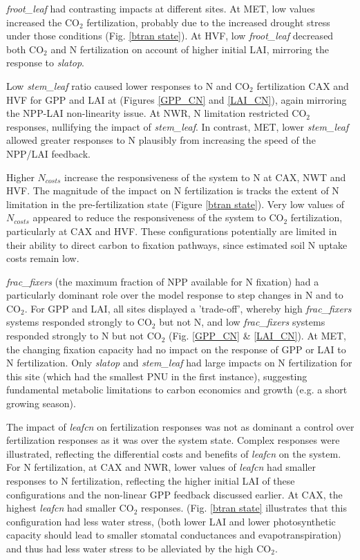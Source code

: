 \documentclass[draft,linenumbers]{agujournal}
\begin{document}
\emph{froot\_leaf} had contrasting impacts at different sites.  At MET,  low values increased the CO$_{2}$ fertilization, probably due to the increased drought stress under those conditions (Fig. \ref{btran state}). At HVF, low \emph{froot\_leaf} decreased both CO$_{2}$ and N fertilization on account of higher initial LAI, mirroring the response to \emph{slatop}. 

Low \emph{stem\_leaf} ratio caused lower responses to N and CO$_{2}$ fertilization CAX and HVF for GPP and LAI at  (Figures \ref{GPP_CN} and \ref{LAI_CN}), again mirroring the NPP-LAI non-linearity issue.  At NWR,  N limitation restricted CO$_{2}$ responses, nullifying the impact of \emph{stem\_leaf}.  In contrast, MET, lower \emph{stem\_leaf} allowed greater responses to N plausibly from increasing the speed of the NPP/LAI feedback.  

Higher $N_{costs}$ increase the responsiveness of the system to N at CAX, NWT and HVF.  The magnitude of the impact on N fertilization is tracks the extent of N limitation in the pre-fertilization state (Figure \ref{btran state}).   Very low values of $N_{costs}$ appeared to reduce the responsiveness of the system to CO$_{2}$ fertilization, particularly at CAX and HVF. These configurations potentially are limited in their ability to direct carbon to fixation pathways, since estimated soil N uptake costs remain low.   

\emph{frac\_fixers} (the maximum fraction of NPP available for N fixation) had a particularly dominant role over the model response to step changes in N and to CO$_{2}$. For GPP and LAI, all sites displayed a 'trade-off', whereby high \emph{frac\_fixers} systems responded strongly to CO$_{2}$ but not N, and low \emph{frac\_fixers} systems responded strongly to N but not CO$_{2}$ (Fig. \ref{GPP_CN} \& \ref{LAI_CN}).   At MET,  the changing fixation capacity had no impact on the response of GPP or LAI to N fertilization.  Only \emph{slatop} and \emph{stem\_leaf} had large impacts on N fertilization for this site (which had the smallest PNU in the first instance), suggesting fundamental metabolic limitations to carbon economics and growth (e.g. a short growing season). 

The impact of \emph{leafcn} on fertilization responses was not as dominant a control over fertilization responses as it was over the system state. Complex responses were illustrated, reflecting the differential costs and benefits of \emph{leafcn} on the system.  For N fertilization, at CAX and NWR, lower values of \emph{leafcn} had smaller responses to N fertilization, reflecting the higher initial LAI of these configurations and the non-linear GPP feedback discussed earlier.   At CAX, the highest \emph{leafcn} had smaller CO$_{2}$ responses. (Fig. \ref{btran state} illustrates that this configuration had less water stress, (both lower LAI and lower photosynthetic capacity should lead to smaller stomatal conductances and evapotranspiration) and thus had less water stress to be alleviated by the high CO$_{2}$.
\end{document}

